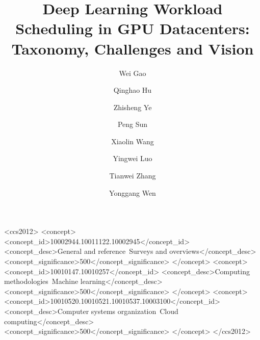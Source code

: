 \documentclass[acmsmall]{acmart}
\begin{document}
\title{Deep Learning Workload Scheduling in GPU Datacenters: Taxonomy, Challenges and Vision}



\author{Wei Gao}
\author{Qinghao Hu}
\authornotemark[1]
\author{Zhisheng Ye}
\authornotemark[1]
\author{Peng Sun}
\author{Xiaolin Wang}
\author{Yingwei Luo}
\author{Tianwei Zhang}
\author{Yonggang Wen}

\renewcommand{\shortauthors}{Gao, Hu and Ye, et al.}



\begin{CCSXML}
  <ccs2012>
  <concept>
  <concept_id>10002944.10011122.10002945</concept_id>
  <concept_desc>General and reference~Surveys and overviews</concept_desc>
  <concept_significance>500</concept_significance>
  </concept>
  <concept>
  <concept_id>10010147.10010257</concept_id>
  <concept_desc>Computing methodologies~Machine learning</concept_desc>
  <concept_significance>500</concept_significance>
  </concept>
  <concept>
  <concept_id>10010520.10010521.10010537.10003100</concept_id>
  <concept_desc>Computer systems organization~Cloud computing</concept_desc>
  <concept_significance>500</concept_significance>
  </concept>
  </ccs2012>
\end{CCSXML}




\maketitle













\end{document}
